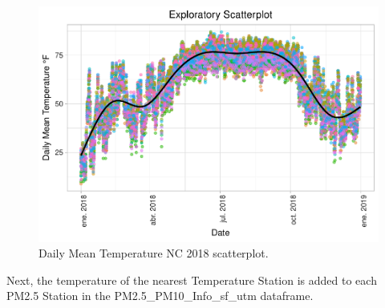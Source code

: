 \documentclass[12pt,]{article}
\begin{document}
\begin{figure}
\centering
\includegraphics{Raby_ENV872_Project_files/figure-latex/unnamed-chunk-32-1.pdf}
\caption{Daily Mean Temperature NC 2018 scatterplot.
\label{Temp_scatterplot}}
\end{figure}

Next, the temperature of the nearest Temperature Station is added to
each PM2.5 Station in the PM2.5\_PM10\_Info\_sf\_utm dataframe.
\end{document}
